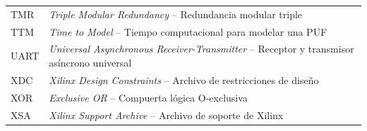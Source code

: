 \begin{longtable}{@{}p{2.2cm}@{}p{\dimexpr\textwidth-2.2cm\relax}@{}}
TMR    & \textit{Triple Modular Redundancy} -- Redundancia modular triple \\[4pt]
TTM    & \textit{Time to Model} -- Tiempo computacional para modelar una PUF \\[4pt]
UART   & \textit{Universal Asynchronous Receiver-Transmitter} -- Receptor y transmisor asíncrono universal \\[4pt]
XDC    & \textit{Xilinx Design Constraints} -- Archivo de restricciones de diseño \\[4pt]
XOR    & \textit{Exclusive OR} -- Compuerta lógica O-exclusiva \\[4pt]
XSA    & \textit{Xilinx Support Archive} -- Archivo de soporte de Xilinx \\

\end{longtable}